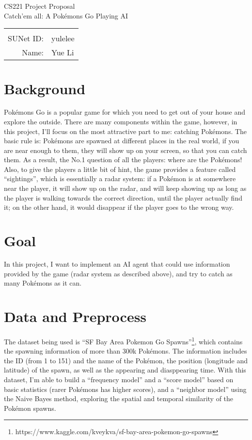 \documentclass[12pt]{article}
\begin{document}
\begin{center}
{\Large CS221 Project Proposal\\
Catch'em all: A Pok\'emons Go Playing AI}

\begin{tabular}{rl}
\newline
\\ 
SUNet ID: & yulelee \\
Name: & Yue Li \\
\end{tabular}
\end{center}
\section*{Background}
Pok\'emons Go is a popular game for which
you need to get out of your 
house and explore the outside. 
There are many components within the game, however, in this project, I'll focus on 
the most attractive part to me: 
catching Pok\'emons. The basic rule is: Pok\'emons are spawned at
different places in the real world, if you are near enough to them, 
they will show up on your screen, so that 
you can catch them. As a result, the No.1 question of all the players:
where are the Pok\'emons! 
Also, to give the players a little bit of hint, the game
provides a feature called ``sightings'', 
which is essentially a radar system: if
a Pok\'emon is at somewhere 
near the player,
it will show up on the radar, and will keep showing up as long as
the player is walking towards the correct direction, until the player 
actually find it; on the other hand,
it would disappear if the player goes to the 
wrong way.
\section*{Goal}
In this project, I want to implement an
AI agent that could use information provided by the game (radar system as 
described
above), and try to catch
as many Pok\'emons as it can. 

\section*{Data and Preprocess}
The dataset being used is ``SF Bay Area Pokemon Go Spawns''\footnote{https://www.kaggle.com/kveykva/sf-bay-area-pokemon-go-spawns}, which 
contains the spawning information of more than 300k Pok\'emons. The information
includes the ID (from 1 to 151) and the name of the Pok\'emon, the position
(longitude and latitude) of the spawn, as well as the appearing and diasppearing
time. With this dataset, I'm able to build a ``frequency model'' and a ``score model'' based on basic statistics (rarer Pok\'emons has higher scores), and a ``neighbor model'' using the Naive Bayes 
method, exploring the spatial and temporal similarity of the Pok\'emon spawns.
\end{document}
